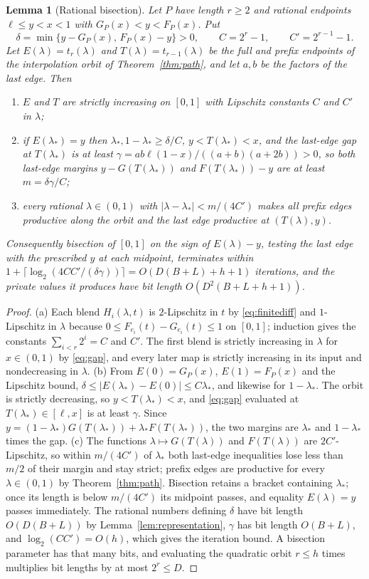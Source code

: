 \documentclass[11pt,a4paper]{article}
\theoremstyle{plain}
\newtheorem{lemma}[theorem]{Lemma}
\theoremstyle{definition}
\theoremstyle{remark}
\begin{document}
\begin{lemma}[Rational bisection]\label{lem:bisection}
Let $P$ have length $r\ge2$ and rational endpoints $\ell\le y<x<1$ with $G_P(x)<y<F_P(x)$. Put
\[
  \delta=\min\{y-G_P(x),\,F_P(x)-y\}>0,\qquad C=2^r-1,\qquad C'=2^{r-1}-1 .
\]
Let $E(\lambda)=t_r(\lambda)$ and $T(\lambda)=t_{r-1}(\lambda)$ be the full and prefix endpoints of the interpolation orbit of Theorem~\ref{thm:path}, and let $a,b$ be the factors of the last edge. Then
\begin{enumerate}[label=(\alph*)]
\item $E$ and $T$ are strictly increasing on $[0,1]$ with Lipschitz constants $C$ and $C'$ in $\lambda$;
\item if $E(\lambda_*)=y$ then $\lambda_*,1-\lambda_*\ge\delta/C$, $y<T(\lambda_*)<x$, and the last-edge gap at $T(\lambda_*)$ is at least $\gamma=ab\ell(1-x)/((a+b)(a+2b))>0$, so both last-edge margins $y-G(T(\lambda_*))$ and $F(T(\lambda_*))-y$ are at least $m=\delta\gamma/C$;
\item every rational $\lambda\in(0,1)$ with $|\lambda-\lambda_*|<m/(4C')$ makes all prefix edges productive along the orbit and the last edge productive at $(T(\lambda),y)$.
\end{enumerate}
Consequently bisection of $[0,1]$ on the sign of $E(\lambda)-y$, testing the last edge with the prescribed $y$ at each midpoint, terminates within $1+\lceil\log_2(4CC'/(\delta\gamma))\rceil=O(D(B+L)+h+1)$ iterations, and the private values it produces have bit length $O(D^2(B+L+h+1))$.
\end{lemma}

\begin{proof}
(a) Each blend $H_i(\lambda,t)$ is $2$-Lipschitz in $t$ by \eqref{eq:finitediff} and $1$-Lipschitz in $\lambda$ because $0\le F_{e_i}(t)-G_{e_i}(t)\le1$ on $[0,1]$; induction gives the constants $\sum_{i<r}2^i=C$ and $C'$. The first blend is strictly increasing in $\lambda$ for $x\in(0,1)$ by \eqref{eq:gap}, and every later map is strictly increasing in its input and nondecreasing in $\lambda$. (b) From $E(0)=G_P(x)$, $E(1)=F_P(x)$ and the Lipschitz bound, $\delta\le|E(\lambda_*)-E(0)|\le C\lambda_*$, and likewise for $1-\lambda_*$. The orbit is strictly decreasing, so $y<T(\lambda_*)<x$, and \eqref{eq:gap} evaluated at $T(\lambda_*)\in[\ell,x]$ is at least $\gamma$. Since $y=(1-\lambda_*)G(T(\lambda_*))+\lambda_*F(T(\lambda_*))$, the two margins are $\lambda_*$ and $1-\lambda_*$ times the gap. (c) The functions $\lambda\mapsto G(T(\lambda))$ and $F(T(\lambda))$ are $2C'$-Lipschitz, so within $m/(4C')$ of $\lambda_*$ both last-edge inequalities lose less than $m/2$ of their margin and stay strict; prefix edges are productive for every $\lambda\in(0,1)$ by Theorem~\ref{thm:path}. Bisection retains a bracket containing $\lambda_*$; once its length is below $m/(4C')$ its midpoint passes, and equality $E(\lambda)=y$ passes immediately. The rational numbers defining $\delta$ have bit length $O(D(B+L))$ by Lemma~\ref{lem:representation}, $\gamma$ has bit length $O(B+L)$, and $\log_2(CC')=O(h)$, which gives the iteration bound. A bisection parameter has that many bits, and evaluating the quadratic orbit $r\le h$ times multiplies bit lengths by at most $2^r\le D$.
\end{proof}
\end{document}
